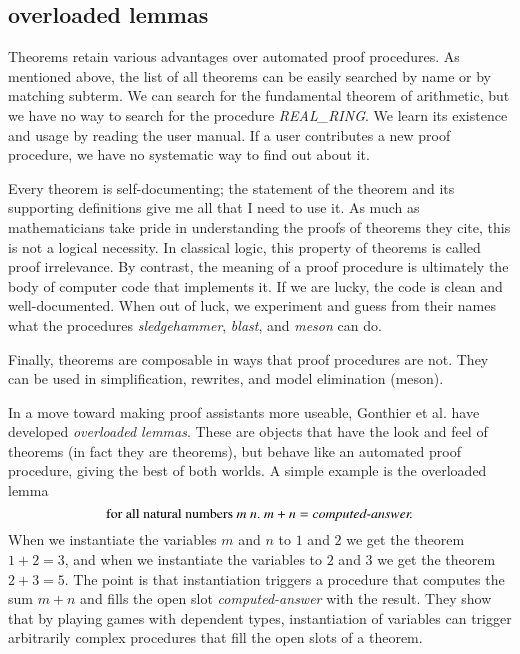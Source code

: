 \documentclass{llncs}
\begin{document}


\subsection{overloaded lemmas}


Theorems retain various advantages over automated proof procedures.  
As mentioned above, the list of all theorems can be easily searched by name or by
matching subterm.  We can search for the fundamental theorem of arithmetic, but we
have no way to search for the procedure {\it REAL\_RING}.  We learn its existence and
usage by reading the user manual.  If a user contributes a new proof procedure, we
have no systematic way to find out about it.

Every theorem is self-documenting; the statement of the theorem and
its supporting definitions give me all that I need to use it. As much
as mathematicians take pride in understanding the proofs of theorems
they cite, this is not a logical necessity.  In classical logic, this
property of theorems is called proof irrelevance.  By contrast, the
meaning of a proof procedure is ultimately the body of computer code
that implements it.  If we are lucky, the code is clean and
well-documented.  When out of luck, we experiment and guess from their
names what the procedures
{\it sledgehammer}, {\it blast}, and {\it meson} can do.

Finally, theorems are composable in ways that proof procedures are not.  They
can be used in simplification, rewrites, and model elimination (meson).

In a move toward making proof assistants more useable, Gonthier et al.
have developed {\it overloaded lemmas}.  These are objects that have
the look and feel of theorems (in fact they are theorems), but behave
like an automated proof procedure, giving the best of both worlds.
A simple example is the overloaded lemma
\[
\text{for all natural numbers}~m~n.~m+n  = \text{\it computed-answer.}
\]
When we instantiate the variables $m$ and $n$ to $1$ and $2$ we get
the theorem $1+2=3$, and when we instantiate the variables to $2$ and
$3$ we get the theorem $2+3=5$.  The point is that instantiation
triggers a procedure that computes the sum $m+n$ and fills the open
slot {\it computed-answer} with the result.  They show that by playing
games with dependent types,
instantiation of variables can trigger arbitrarily complex procedures
that fill the open slots of a theorem.
\end{document}
